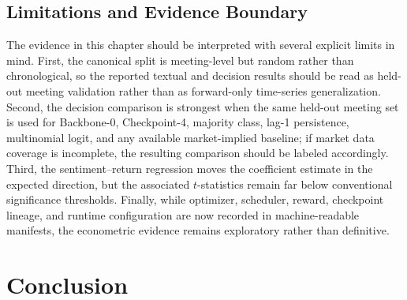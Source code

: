 \subsection*{Limitations and Evidence Boundary}

The evidence in this chapter should be interpreted with several explicit limits in mind. First, the canonical split is meeting-level but random rather than chronological, so the reported textual and decision results should be read as held-out meeting validation rather than as forward-only time-series generalization. Second, the decision comparison is strongest when the same held-out meeting set is used for Backbone-0, Checkpoint-4, majority class, lag-1 persistence, multinomial logit, and any available market-implied baseline; if market data coverage is incomplete, the resulting comparison should be labeled accordingly. Third, the sentiment--return regression moves the coefficient estimate in the expected direction, but the associated $t$-statistics remain far below conventional significance thresholds. Finally, while optimizer, scheduler, reward, checkpoint lineage, and runtime configuration are now recorded in machine-readable manifests, the econometric evidence remains exploratory rather than definitive.









\section{Conclusion}\label{ch2:sec:conclusion}

